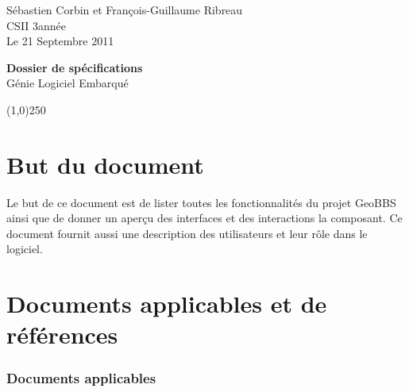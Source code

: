 \documentclass[a4paper,12pt]{report}
\begin{document}
  \begin{onehalfspace}

    \begin{titlepage}
      \begin{center}
        Sébastien Corbin et François-Guillaume Ribreau\\
        CSII 3\ieme année\\
        Le 21 Septembre 2011\\
      \end{center}
      \hrulefill
      \vspace{7cm}
      \begin{center}
        \LARGE \textbf{Dossier de spécifications}\\
        \vspace{3cm}
        \normalsize Génie Logiciel Embarqué
      \end{center}

      \vspace{9,5cm}

      \begin{center}
      \line(1,0){250}
      \end{center}

      \begin{center}
      \tiny{\currfilename}
      \end{center}


    \end{titlepage}
    \clearpage

  \thispagestyle{empty}
  \setcounter{page}{0}
  \clearpage

\chapter{But du document}
Le but de ce document est de lister toutes les fonctionnalités du projet GeoBBS ainsi que de donner un aperçu des interfaces et des interactions la composant. Ce document fournit aussi une description des utilisateurs et leur rôle dans le logiciel.

\chapter{Documents applicables et de références}

\subsection{Documents applicables} %
\label{sub:documents_applicables}


\end{onehalfspace}
\end{document}
